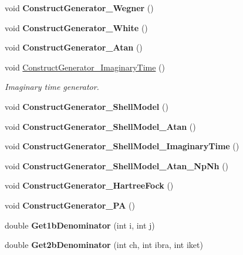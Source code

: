 \begin{DoxyCompactItemize}
void {\bfseries Construct\+Generator\+\_\+\+Wegner} ()
\item 
\mbox{\label{classGenerator_a6b1002683938b1c35bb11d1015f5c355}} 
void {\bfseries Construct\+Generator\+\_\+\+White} ()
\item 
\mbox{\label{classGenerator_a21aca2870eba12b00cceb2a5dd4e16fd}} 
void {\bfseries Construct\+Generator\+\_\+\+Atan} ()
\item 
\mbox{\label{classGenerator_a7186a187278d51eefbd031610364a6f9}} 
void \hyperlink{classGenerator_a7186a187278d51eefbd031610364a6f9}{Construct\+Generator\+\_\+\+Imaginary\+Time} ()
\begin{DoxyCompactList}\small\item\em Imaginary time generator. \end{DoxyCompactList}\item 
\mbox{\label{classGenerator_aacb7b050f13d5128bf4e25466771c3e5}} 
void {\bfseries Construct\+Generator\+\_\+\+Shell\+Model} ()
\item 
\mbox{\label{classGenerator_a63e1fd24254bf3a1303d277a3bd7f7be}} 
void {\bfseries Construct\+Generator\+\_\+\+Shell\+Model\+\_\+\+Atan} ()
\item 
\mbox{\label{classGenerator_a9ff402c2b8b503093aa415bf4699b65f}} 
void {\bfseries Construct\+Generator\+\_\+\+Shell\+Model\+\_\+\+Imaginary\+Time} ()
\item 
\mbox{\label{classGenerator_ad3e933ca421ca536c6eee645540e573d}} 
void {\bfseries Construct\+Generator\+\_\+\+Shell\+Model\+\_\+\+Atan\+\_\+\+Np\+Nh} ()
\item 
\mbox{\label{classGenerator_a882fafcb7ddaf180372796f300944cea}} 
void {\bfseries Construct\+Generator\+\_\+\+Hartree\+Fock} ()
\item 
\mbox{\label{classGenerator_a38f098558ac5a5f1512bfa8a0307bbcd}} 
void {\bfseries Construct\+Generator\+\_\+PA} ()
\item 
\mbox{\label{classGenerator_a8439dade021caa9df07dbce05d23f3b7}} 
double {\bfseries Get1b\+Denominator} (int i, int j)
\item 
\mbox{\label{classGenerator_aa78e55b09268849734ff97ac2d71b591}} 
double {\bfseries Get2b\+Denominator} (int ch, int ibra, int iket)
\end{DoxyCompactItemize}
